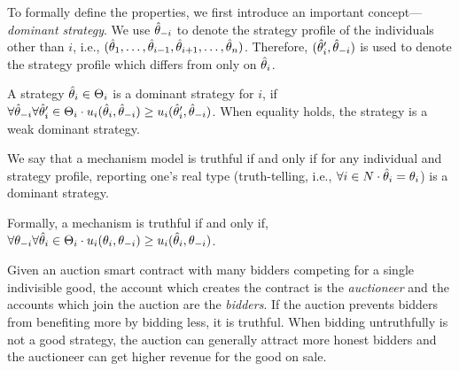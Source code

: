 
To formally define the properties, we first introduce an important concept---\emph{dominant
strategy}.
We use $\hat{\theta}_{-i}$ to denote the strategy profile of the individuals other than $i$, i.e.,
$(\hat{\theta}_1, \ldots, \hat{\theta}_{i-1},\allowbreak \hat{\theta}_{i+1},\allowbreak \ldots,\allowbreak
\hat{\theta}_n)$.
Therefore, $(\hat{\theta}_i', \hat{\theta}_{-i})$ is used to denote the strategy profile which differs from
\report only on $\hat{\theta}_i$.

\begin{definition}
  A strategy $\hat{\theta}_i \in \Theta_i$ is a dominant strategy for $i$, if $\forall
  \hat{\theta}_{-i} \forall \hat{\theta}_i' \in \Theta_i \cdot u_i(\hat{\theta}_i, \hat{\theta}_{-i}) \geq
  u_i(\hat{\theta}_i', \hat{\theta}_{-i})$.
  When equality holds, the strategy is a weak dominant strategy.
\end{definition}

We say that a mechanism model is truthful if and only if for any individual and strategy profile,
reporting one's real type (truth-telling, i.e., $\forall i \in N \cdot \hat{\theta}_i = \theta_i$) is a
dominant strategy.

\begin{definition}[Truthfulness]\label{def:truthful}
  Formally, a mechanism is truthful if and only if,  $\forall \theta_{-i} \forall \hat{\theta}_i \in
  \Theta_i \cdot u_i(\theta_{i}, \theta_{-i}) \geq u_i(\hat{\theta}_i, \theta_{-i})$.
\end{definition}
%
Given an auction smart contract with many bidders competing for a single indivisible good, the
account which creates the contract is the \emph{auctioneer} and the accounts which join the auction
are the \emph{bidders}.
If the auction prevents bidders from benefiting more by bidding less, it is truthful.
When bidding untruthfully is not a good strategy, the auction can generally attract more honest
bidders and the auctioneer can get higher revenue for the good on sale.


